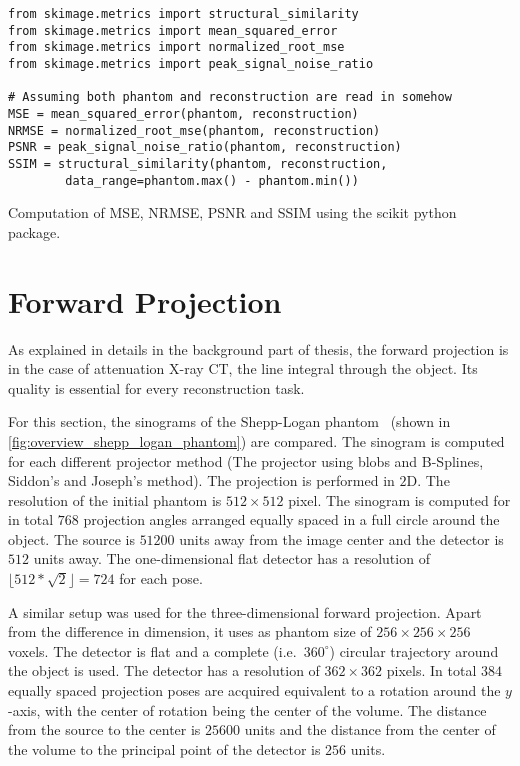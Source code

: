 \begin{listing}[h]
	\begin{verbatim}
from skimage.metrics import structural_similarity
from skimage.metrics import mean_squared_error
from skimage.metrics import normalized_root_mse
from skimage.metrics import peak_signal_noise_ratio

# Assuming both phantom and reconstruction are read in somehow
MSE = mean_squared_error(phantom, reconstruction)
NRMSE = normalized_root_mse(phantom, reconstruction)
PSNR = peak_signal_noise_ratio(phantom, reconstruction)
SSIM = structural_similarity(phantom, reconstruction,
        data_range=phantom.max() - phantom.min())
    \end{verbatim}
	\caption{Computation of \gls{MSE}, \gls{NRMSE}, \gls{PSNR} and \gls{SSIM} using the scikit
		python package.}\label{py:error_metric}
\end{listing}

\section{Forward Projection}\label{sec:experiments_forward_projection}

As explained in details in the background part of thesis, the forward projection is in the case of
attenuation X-ray CT, the line integral through the object. Its quality is essential for every
reconstruction task.

For this section, the sinograms of the Shepp-Logan phantom~\cite{shepp_fourier_1974} (shown in
\autoref{fig:overview_shepp_logan_phantom}) are compared. The sinogram is computed for each
different projector method (The projector using blobs and B-Splines, Siddon's and Joseph's method).
The projection is performed in \(2\)D. The resolution of the initial phantom is \(512 \times 512\)
pixel. The sinogram is computed for in total \(768\) projection angles arranged equally spaced in a
full circle around the object. The source is \(51200\) units away from the image center and the
detector is \(512\) units away. The one-dimensional flat detector has a resolution of \(\lfloor 512
* \sqrt{2} \rfloor = 724\) for each pose.

A similar setup was used for the three-dimensional forward projection. Apart from the difference in
dimension, it uses as phantom size of \(256 \times 256 \times 256\) voxels. The detector is flat and
a complete (i.e.\ \(360^\circ\)) circular trajectory around the object is used. The detector has a
resolution of \(362 \times 362\) pixels. In total \(384\) equally spaced projection poses are
acquired equivalent to a rotation around the \(y\)-axis, with the center of rotation being the
center of the volume. The distance from the source to the center is \(25600\) units and the
distance from the center of the volume to the principal point of the detector is \(256\) units.

